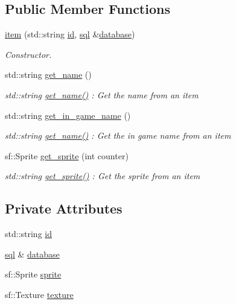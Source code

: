 \subsection*{Public Member Functions}
\begin{DoxyCompactItemize}
\item 
\hyperlink{classitem_a235883f911ed8fad4679655a57d23d96}{item} (std\+::string \hyperlink{classitem_af512775a194b958ca9630d59ed0daf27}{id}, \hyperlink{classsql}{sql} \&\hyperlink{classitem_a0a822c97c7e59706475fc5e541926df3}{database})
\begin{DoxyCompactList}\small\item\em Constructor. \end{DoxyCompactList}\item 
std\+::string \hyperlink{classitem_ab7c2fa653e0f9a565283b60ca325f2a7}{get\+\_\+name} ()
\begin{DoxyCompactList}\small\item\em std\+::string \hyperlink{classitem_ab7c2fa653e0f9a565283b60ca325f2a7}{get\+\_\+name()} \+: Get the name from an item \end{DoxyCompactList}\item 
std\+::string \hyperlink{classitem_aa5a9140482a7d88d6a3eea342cb0c082}{get\+\_\+in\+\_\+game\+\_\+name} ()
\begin{DoxyCompactList}\small\item\em std\+::string \hyperlink{classitem_ab7c2fa653e0f9a565283b60ca325f2a7}{get\+\_\+name()} \+: Get the in game name from an item \end{DoxyCompactList}\item 
sf\+::\+Sprite \hyperlink{classitem_aafc61a4b7e2bd10300a6767e6dd7281e}{get\+\_\+sprite} (int counter)
\begin{DoxyCompactList}\small\item\em std\+::string \hyperlink{classitem_aafc61a4b7e2bd10300a6767e6dd7281e}{get\+\_\+sprite()} \+: Get the sprite from an item \end{DoxyCompactList}\end{DoxyCompactItemize}
\subsection*{Private Attributes}
\begin{DoxyCompactItemize}
\item 
std\+::string \hyperlink{classitem_af512775a194b958ca9630d59ed0daf27}{id}
\item 
\hyperlink{classsql}{sql} \& \hyperlink{classitem_a0a822c97c7e59706475fc5e541926df3}{database}
\item 
sf\+::\+Sprite \hyperlink{classitem_adb991244770ef45558a35510f38ffb04}{sprite}
\item 
sf\+::\+Texture \hyperlink{classitem_af2fe0df797bc29b4b907e03823df5c3c}{texture}
\end{DoxyCompactItemize}


